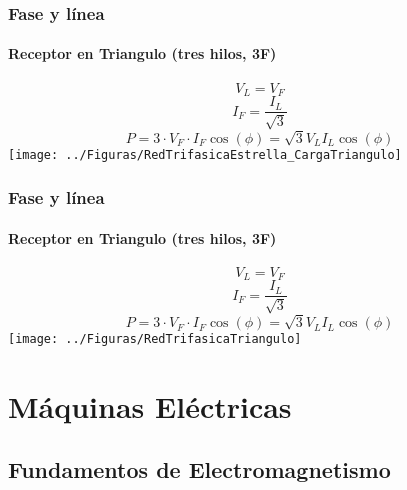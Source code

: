 \documentclass[serif, xcolor=dvipsnames]{beamer}
\begin{document}
\begin{frame}[plain]
  \frametitle{Fase y línea}


  \framesubtitle{Receptor en Triangulo (tres hilos, 3F)}
  \begin{block} {}

    \begin{center}
      \[
      V_{L}=V_{F}
      \]
      \[
      I_{F}=\frac{I_{L}}{\sqrt{3}}
      \]
      \[
      P=3\cdot V_{F}\cdot I_{F}\cos(\phi)=\sqrt{3}V_{L}I_{L}\cos(\phi)
      \]
      \texttt{[image: ../Figuras/RedTrifasicaEstrella\_CargaTriangulo]}
      \par\end{center}

  \end{block}

\end{frame}
\begin{frame}[plain]
  \frametitle{Fase y línea}


  \framesubtitle{Receptor en Triangulo (tres hilos, 3F)}
  \begin{block} {}

    \begin{center}
      \[
      V_{L}=V_{F}
      \]
      \[
      I_{F}=\frac{I_{L}}{\sqrt{3}}
      \]
      \[
      P=3\cdot V_{F}\cdot I_{F}\cos(\phi)=\sqrt{3}V_{L}I_{L}\cos(\phi)
      \]
      \texttt{[image: ../Figuras/RedTrifasicaTriangulo]}
      \par\end{center}

  \end{block}

\end{frame}

\section{Máquinas Eléctricas}

\subsection{Fundamentos de Electromagnetismo}
\end{document}
